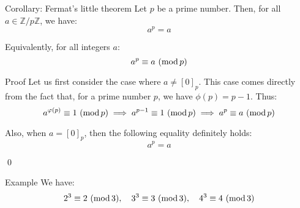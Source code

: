 \documentclass[a4paper]{article}
\begin{document}
\begin{parag}{Corollary: Fermat's little theorem}
    Let $p$ be a prime number. Then, for all $a \in \mathbb{Z} / p\mathbb{Z}$, we have:
    \[a^p = a\]

    Equivalently, for all integers $a$:
    \[a^p \equiv a\ (\operatorname{mod} p)\]

    \begin{subparag}{Proof}
        Let us first consider the case where $a \neq \left[0\right]_p$. This case comes directly from the fact that, for a prime number $p$, we have $\phi\left(p\right) = p - 1$. Thus:
        \[\congruent{a^{\phi\left(p\right)}}{1}{p} \implies \congruent{a^{p-1}}{1}{p} \implies \congruent{a^p}{a}{p}\]

        Also, when $a = \left[0\right]_p$, then the following equality definitely holds:
        \[a^p = a\]

        \qed
    \end{subparag}

    \begin{subparag}{Example}
        We have:
        \[2^3 \equiv 2\ (\operatorname{mod} 3), \quad 3^3 \equiv 3\ (\operatorname{mod} 3), \quad 4^3 \equiv 4\ (\operatorname{mod} 3)\]
    \end{subparag}
\end{parag}
\end{document}
